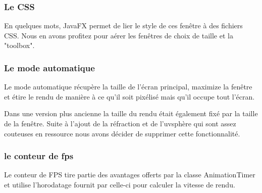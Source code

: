 \subsubsection{Le CSS}

En quelques mots, JavaFX permet de lier le style de ces fenêtre à des fichiers CSS. Nous en avons profitez pour aérer les fenêtres de choix de taille et la "toolbox".

\subsubsection{Le mode automatique}

Le mode automatique récupère la taille de l'écran principal, maximize la fenêtre et étire le rendu de manière à ce qu'il soit pixélisé mais qu'il occupe tout l'écran.

Dans une version plus ancienne la taille du rendu était également fixé par la taille de la fenêtre. Suite à l'ajout de la réfraction et de l'uvsphère qui sont assez couteuses en ressource nous avons décider de supprimer cette fonctionnalité.

\subsubsection{le conteur de fps}

Le conteur de FPS tire partie des avantages offerts par la classe AnimationTimer et utilise l'horodatage fournit par celle-ci pour calculer la vitesse de rendu.
